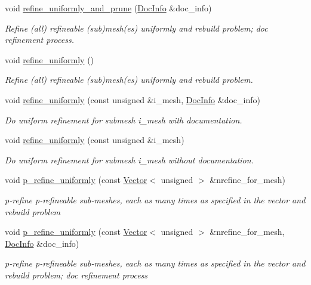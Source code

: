\begin{DoxyCompactItemize}
void \hyperlink{classoomph_1_1Problem_ac0495df29dde90577e4702fcac496684}{refine\+\_\+uniformly\+\_\+and\+\_\+prune} (\hyperlink{classoomph_1_1DocInfo}{Doc\+Info} \&doc\+\_\+info)
\begin{DoxyCompactList}\small\item\em Refine (all) refineable (sub)mesh(es) uniformly and rebuild problem; doc refinement process. \end{DoxyCompactList}\item 
void \hyperlink{classoomph_1_1Problem_ade208b7d7d8e866d5ba896f03edb1f9a}{refine\+\_\+uniformly} ()
\begin{DoxyCompactList}\small\item\em Refine (all) refineable (sub)mesh(es) uniformly and rebuild problem. \end{DoxyCompactList}\item 
void \hyperlink{classoomph_1_1Problem_a74d1904dd72eaf71c015470a23caef5f}{refine\+\_\+uniformly} (const unsigned \&i\+\_\+mesh, \hyperlink{classoomph_1_1DocInfo}{Doc\+Info} \&doc\+\_\+info)
\begin{DoxyCompactList}\small\item\em Do uniform refinement for submesh i\+\_\+mesh with documentation. \end{DoxyCompactList}\item 
void \hyperlink{classoomph_1_1Problem_afae401b74b58d6312da32f153b78047d}{refine\+\_\+uniformly} (const unsigned \&i\+\_\+mesh)
\begin{DoxyCompactList}\small\item\em Do uniform refinement for submesh i\+\_\+mesh without documentation. \end{DoxyCompactList}\item 
void \hyperlink{classoomph_1_1Problem_a3aaea4b1be43f5d4bb187a8c6d3ca16f}{p\+\_\+refine\+\_\+uniformly} (const \hyperlink{classoomph_1_1Vector}{Vector}$<$ unsigned $>$ \&nrefine\+\_\+for\+\_\+mesh)
\begin{DoxyCompactList}\small\item\em p-\/refine p-\/refineable sub-\/meshes, each as many times as specified in the vector and rebuild problem \end{DoxyCompactList}\item 
void \hyperlink{classoomph_1_1Problem_a0a980d9659db60b113b6d4e7431594b7}{p\+\_\+refine\+\_\+uniformly} (const \hyperlink{classoomph_1_1Vector}{Vector}$<$ unsigned $>$ \&nrefine\+\_\+for\+\_\+mesh, \hyperlink{classoomph_1_1DocInfo}{Doc\+Info} \&doc\+\_\+info)
\begin{DoxyCompactList}\small\item\em p-\/refine p-\/refineable sub-\/meshes, each as many times as specified in the vector and rebuild problem; doc refinement process \end{DoxyCompactList}\item 

\end{DoxyCompactItemize}
